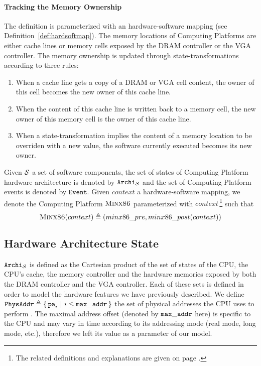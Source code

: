 \paragraph{Tracking the Memory Ownership} The  definition is
parameterized with an hardware-software mapping (see
Definition~\ref{def:hardsoftmap}). The memory locations of 
Computing Platforms are either cache lines or memory cells exposed by the DRAM
controller or the VGA controller. The memory ownership is updated through
state-transformations according to three rules:
\begin{enumerate}
\item When a cache line gets a copy of a DRAM or VGA cell content, the owner of
  this cell becomes the new owner of this cache line.
\item When the content of this cache line is written back to a memory cell, the
  new owner of this memory cell is the owner of this cache line.
\item When a state-transformation implies the content of a memory location to be
  overriden with a new value, the software currently executed becomes its new
  owner.
\end{enumerate}

Given $\mathcal{S}$ a set of software components, the set of states of
 Computing Platform hardware architecture is denoted by
$\texttt{Archi}_{\mathcal{S}}$ and the set of  Computing Platform
events is denoted by $\texttt{Event}$. Given $context$ a hardware-software
mapping, we denote the Computing Platform $\textsc{Minx86}$ parameterized
with $context$\,\footnote{The related definitions and explanations are given on
  page \pageref{page:minx86def}.} such that
\[ \textsc{Minx86}(context) \triangleq (minx86\_pre,
  minx86\_post(context)) \]

\subsection{Hardware Architecture State}

$\texttt{Archi}_{\mathcal{S}}$ is defined as the Cartesian product of the set of
states of the CPU, the CPU's cache, the memory controller and the hardware
memories exposed by both the DRAM controller and the VGA controller. Each of
these sets is defined in order to model the hardware features we have previously
described. We define
$\texttt{PhysAddr} \triangleq \{\,\mathtt{pa}_i\ |\ i \leq \mathtt{max\_addr}\,\}$ the
set of physical addresses the CPU uses to perform \IO. The maximal address
offset (denoted by $\mathtt{max\_addr}$ here) is specific to the CPU and may vary
in time according to its addressing mode (real mode, long mode, etc.), therefore
we left its value as a parameter of our model.

